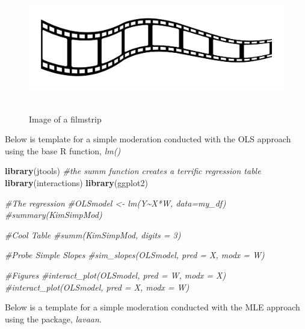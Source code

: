 \documentclass[
  11pt,
]{book}
\newenvironment{Shaded}{\begin{snugshade}}{\end{snugshade}}
\newcommand{\CommentTok}[1]{\textcolor[rgb]{0.37,0.37,0.37}{\textit{#1}}}
\newcommand{\FunctionTok}[1]{\textcolor[rgb]{0.27,0.27,0.27}{\textbf{#1}}}
\newcommand{\NormalTok}[1]{#1}
\begin{document}
\begin{figure}
\hypertarget{id}{%
\centering
\includegraphics[width=6.45833in,height=2.19792in]{images/film-strip-1.jpg}
\caption{Image of a filmstrip}\label{id}
}
\end{figure}

Below is template for a simple moderation conducted with the OLS approach using the base R function, \emph{lm()}

\begin{Shaded}
\begin{Highlighting}[]
\FunctionTok{library}\NormalTok{(jtools) }\CommentTok{\#the summ function creates a terrific regression table}
\FunctionTok{library}\NormalTok{(interactions)}
\FunctionTok{library}\NormalTok{(ggplot2)}

\CommentTok{\#The regression}
\CommentTok{\#OLSmodel \textless{}{-} lm(Y\textasciitilde{}X*W, data=my\_df)}
\CommentTok{\#summary(KimSimpMod)}

\CommentTok{\#Cool Table}
\CommentTok{\#summ(KimSimpMod, digits = 3)}

\CommentTok{\#Probe Simple Slopes}
\CommentTok{\#sim\_slopes(OLSmodel, pred = X, modx = W)}

\CommentTok{\#Figures}
\CommentTok{\#interact\_plot(OLSmodel, pred = W, modx = X)}
\CommentTok{\#interact\_plot(OLSmodel, pred = X, modx = W)}
\end{Highlighting}
\end{Shaded}

Below is a template for a simple moderation conducted with the MLE approach using the package, \emph{lavaan}.
\end{document}
